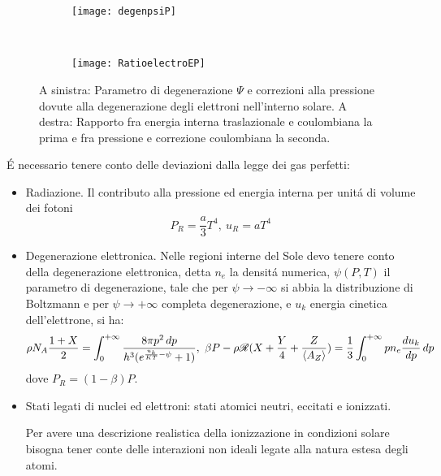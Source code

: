 \documentclass[../main.tex]{subfiles}
\begin{document}
\begin{figure}[!h]
\label{fig:degenelectrocorrection}
\centering
	\begin{subfigure}[t]{0.5\textwidth}
\texttt{[image: degenpsiP]}\label{fig:degenpsiP}
\end{subfigure}%
~
\begin{subfigure}[t]{0.5\textwidth}
\texttt{[image: RatioelectroEP]}\label{fig:RatioelectroEP}
\end{subfigure}
\caption{A sinistra: Parametro di degenerazione $\Psi$ e correzioni alla pressione dovute alla degenerazione degli elettroni nell'interno solare. A destra: Rapporto fra energia interna traslazionale e coulombiana la prima e fra pressione e correzione coulombiana la seconda.}
\end{figure}

\'E necessario tenere conto delle deviazioni dalla legge dei gas perfetti:
\begin{itemize}

\item Radiazione. Il contributo alla pressione ed energia interna per unit\'a di volume dei fotoni 
\begin{equation}
P_R=\frac{a}{3}T^4,\ u_R=aT^4
\end{equation}

\item Degenerazione elettronica. Nelle regioni interne del Sole devo tenere conto della degenerazione elettronica, detta $n_e$ la densit\'a numerica, $\psi(P,T)$ il parametro di degenerazione, tale che per $\psi\to-\infty$ si abbia la distribuzione di Boltzmann e per $\psi\to+\infty$ completa degenerazione, e $u_k$ energia cinetica dell'elettrone, si ha:
\begin{equation}
\rho N_A\frac{1+X}{2}=\intzi{}\frac{8\pi p^2\,dp}{h^3(\exp{\frac{u_k}{KT}-\psi}+1)},\ \beta P-\rho\gasconstant{}(X+\frac{Y}{4}+\frac{Z}{\exv{A_Z}})=\frac{1}{3}\intzi{}pn_e\TDy{p}{u_k}\,dp
\end{equation}
dove $P_R=(1-\beta)P$.

\item Stati legati di nuclei ed elettroni: stati atomici neutri, eccitati e ionizzati.

Per avere una descrizione realistica della ionizzazione in condizioni solare bisogna tener conte delle interazioni non ideali legate alla natura estesa degli atomi.

\end{itemize}
\end{document}
